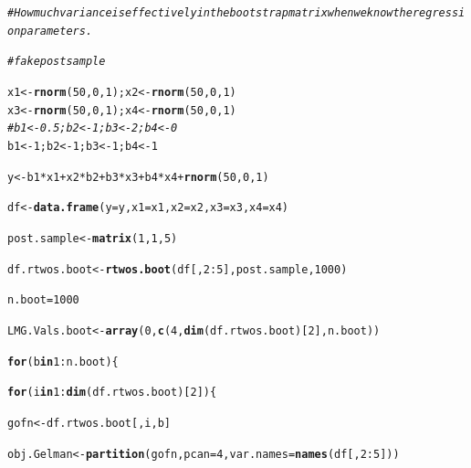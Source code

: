 \documentclass[11pt,a4paper,twoside]{book}\usepackage[]{graphicx}\usepackage[]{color}
\makeatletter
\newcommand{\hlnum}[1]{\textcolor[rgb]{0.686,0.059,0.569}{#1}}%
\newcommand{\hlcom}[1]{\textcolor[rgb]{0.678,0.584,0.686}{\textit{#1}}}%
\newcommand{\hlopt}[1]{\textcolor[rgb]{0,0,0}{#1}}%
\newcommand{\hlstd}[1]{\textcolor[rgb]{0.345,0.345,0.345}{#1}}%
\newcommand{\hlkwa}[1]{\textcolor[rgb]{0.161,0.373,0.58}{\textbf{#1}}}%
\newcommand{\hlkwb}[1]{\textcolor[rgb]{0.69,0.353,0.396}{#1}}%
\newcommand{\hlkwc}[1]{\textcolor[rgb]{0.333,0.667,0.333}{#1}}%
\newcommand{\hlkwd}[1]{\textcolor[rgb]{0.737,0.353,0.396}{\textbf{#1}}}%
\newenvironment{kframe}{%
 \def\at@end@of@kframe{}%
 \ifinner\ifhmode%
  \def\at@end@of@kframe{\end{minipage}}%
  \begin{minipage}{\columnwidth}%
 \fi\fi%
 \def\FrameCommand##1{\hskip\@totalleftmargin \hskip-\fboxsep
 \colorbox{shadecolor}{##1}\hskip-\fboxsep
     \hskip-\linewidth \hskip-\@totalleftmargin \hskip\columnwidth}%
 \MakeFramed {\advance\hsize-\width
   \@totalleftmargin\z@ \linewidth\hsize
   \@setminipage}}%
 {\par\unskip\endMakeFramed%
 \at@end@of@kframe}
\newenvironment{knitrout}{}{} %
\makeatother
\begin{document}
\begin{knitrout}
\color{fgcolor}\begin{kframe}
\begin{alltt}
\hlcom{#How much variance is effectively in the bootstrap matrix when we know the regression parameters.}

\hlcom{#fake post sample}

\hlstd{x1} \hlkwb{<-} \hlkwd{rnorm}\hlstd{(}\hlnum{50}\hlstd{,} \hlnum{0}\hlstd{,} \hlnum{1}\hlstd{); x2} \hlkwb{<-} \hlkwd{rnorm}\hlstd{(}\hlnum{50}\hlstd{,} \hlnum{0}\hlstd{,} \hlnum{1}\hlstd{)}
\hlstd{x3} \hlkwb{<-} \hlkwd{rnorm}\hlstd{(}\hlnum{50}\hlstd{,} \hlnum{0}\hlstd{,} \hlnum{1}\hlstd{); x4} \hlkwb{<-} \hlkwd{rnorm}\hlstd{(}\hlnum{50}\hlstd{,} \hlnum{0}\hlstd{,} \hlnum{1}\hlstd{)}
\hlcom{#b1 <- 0.5; b2 <- 1; b3 <- 2; b4 <- 0}
\hlstd{b1} \hlkwb{<-} \hlnum{1}\hlstd{; b2} \hlkwb{<-} \hlnum{1}\hlstd{; b3} \hlkwb{<-} \hlnum{1}\hlstd{; b4} \hlkwb{<-} \hlnum{1}

\hlstd{y} \hlkwb{<-} \hlstd{b1}\hlopt{*}\hlstd{x1} \hlopt{+} \hlstd{x2}\hlopt{*}\hlstd{b2} \hlopt{+} \hlstd{b3}\hlopt{*}\hlstd{x3} \hlopt{+} \hlstd{b4}\hlopt{*}\hlstd{x4} \hlopt{+} \hlkwd{rnorm}\hlstd{(}\hlnum{50}\hlstd{,} \hlnum{0}\hlstd{,} \hlnum{1}\hlstd{)}

\hlstd{df} \hlkwb{<-} \hlkwd{data.frame}\hlstd{(}\hlkwc{y} \hlstd{= y,} \hlkwc{x1} \hlstd{= x1,} \hlkwc{x2} \hlstd{= x2,} \hlkwc{x3} \hlstd{= x3,} \hlkwc{x4} \hlstd{= x4)}

\hlstd{post.sample} \hlkwb{<-} \hlkwd{matrix}\hlstd{(}\hlnum{1}\hlstd{,} \hlnum{1}\hlstd{,}\hlnum{5}\hlstd{)}

\hlstd{df.rtwos.boot} \hlkwb{<-}\hlkwd{rtwos.boot}\hlstd{(df[,}\hlnum{2}\hlopt{:}\hlnum{5}\hlstd{], post.sample,} \hlnum{1000}\hlstd{)}

\hlstd{n.boot} \hlkwb{=} \hlnum{1000}

\hlstd{LMG.Vals.boot}\hlkwb{<-}\hlkwd{array}\hlstd{(}\hlnum{0}\hlstd{,} \hlkwd{c}\hlstd{(}\hlnum{4}\hlstd{,}\hlkwd{dim}\hlstd{(df.rtwos.boot)[}\hlnum{2}\hlstd{], n.boot))}

\hlkwa{for} \hlstd{(b} \hlkwa{in} \hlnum{1}\hlopt{:}\hlstd{n.boot)\{}

\hlkwa{for}\hlstd{(i} \hlkwa{in} \hlnum{1}\hlopt{:}\hlkwd{dim}\hlstd{(df.rtwos.boot)[}\hlnum{2}\hlstd{])\{}

        \hlstd{gofn}\hlkwb{<-}\hlstd{df.rtwos.boot[,i,b]}

        \hlstd{obj.Gelman}\hlkwb{<-}\hlkwd{partition}\hlstd{(gofn,} \hlkwc{pcan} \hlstd{=} \hlnum{4}\hlstd{,} \hlkwc{var.names} \hlstd{=} \hlkwd{names}\hlstd{(df[,}\hlnum{2}\hlopt{:}\hlnum{5}\hlstd{]))}


\end{alltt}
\end{kframe}
\end{knitrout}
\end{document}
